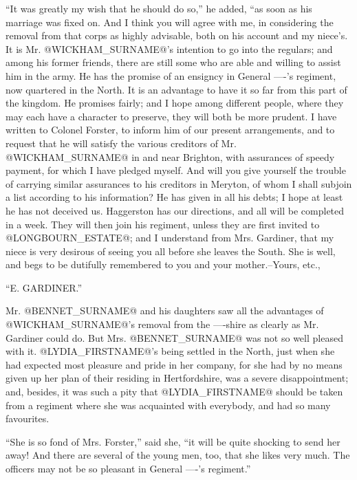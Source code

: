 ``It was greatly my wish that he should do so,'' he added, ``as soon as
his marriage was fixed on. And I think you will agree with me, in
considering the removal from that corps as highly advisable, both on
his account and my niece's. It is Mr. @WICKHAM_SURNAME@'s intention to go into
the regulars; and among his former friends, there are still some who
are able and willing to assist him in the army. He has the promise of an
ensigncy in General ----'s regiment, now quartered in the North. It
is an advantage to have it so far from this part of the kingdom. He
promises fairly; and I hope among different people, where they may each
have a character to preserve, they will both be more prudent. I have
written to Colonel Forster, to inform him of our present arrangements,
and to request that he will satisfy the various creditors of Mr. @WICKHAM_SURNAME@
in and near Brighton, with assurances of speedy payment, for which I
have pledged myself. And will you give yourself the trouble of carrying
similar assurances to his creditors in Meryton, of whom I shall subjoin
a list according to his information? He has given in all his debts; I
hope at least he has not deceived us. Haggerston has our directions,
and all will be completed in a week. They will then join his regiment,
unless they are first invited to @LONGBOURN_ESTATE@; and I understand from Mrs.
Gardiner, that my niece is very desirous of seeing you all before she
leaves the South. She is well, and begs to be dutifully remembered to
you and your mother.--Yours, etc.,

``E. GARDINER.''

Mr. @BENNET_SURNAME@ and his daughters saw all the advantages of @WICKHAM_SURNAME@'s removal
from the ----shire as clearly as Mr. Gardiner could do. But Mrs. @BENNET_SURNAME@
was not so well pleased with it. @LYDIA_FIRSTNAME@'s being settled in the North,
just when she had expected most pleasure and pride in her company,
for she had by no means given up her plan of their residing in
Hertfordshire, was a severe disappointment; and, besides, it was such a
pity that @LYDIA_FIRSTNAME@ should be taken from a regiment where she was acquainted
with everybody, and had so many favourites.

``She is so fond of Mrs. Forster,'' said she, ``it will be quite shocking
to send her away! And there are several of the young men, too, that she
likes very much. The officers may not be so pleasant in General ----'s
regiment.''

